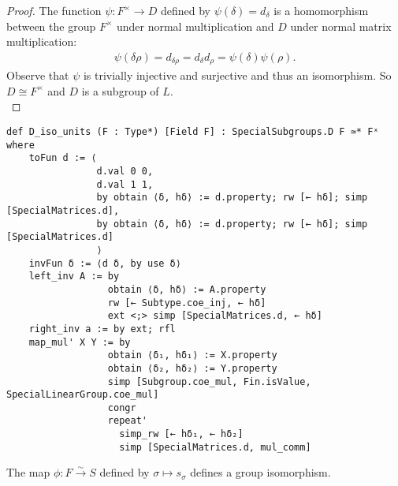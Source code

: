 \begin{proof}
    \leanok
    The function $\psi: F^\times \rightarrow D$ defined by $\psi(\delta) = d_\delta$ is a homomorphism between the group $F^\times$ under normal multiplication and $D$ under normal matrix multiplication:
\begin{align*} \psi(\delta \rho) = d_{\delta \rho} =  d_\delta d_\rho = \psi(\delta) \psi(\rho). 
\end{align*}
Observe that $\psi$ is trivially injective and surjective and thus an isomorphism. So $D\cong F^\times$ and $D$ is a subgroup of $L$.\\
\end{proof}
\begin{footnotesize}
\begin{verbatim}
def D_iso_units (F : Type*) [Field F] : SpecialSubgroups.D F ≃* Fˣ where
    toFun d := ⟨
                d.val 0 0,
                d.val 1 1,
                by obtain ⟨δ, hδ⟩ := d.property; rw [← hδ]; simp [SpecialMatrices.d],
                by obtain ⟨δ, hδ⟩ := d.property; rw [← hδ]; simp [SpecialMatrices.d]
                ⟩
    invFun δ := ⟨d δ, by use δ⟩
    left_inv A := by
                  obtain ⟨δ, hδ⟩ := A.property
                  rw [← Subtype.coe_inj, ← hδ]
                  ext <;> simp [SpecialMatrices.d, ← hδ]
    right_inv a := by ext; rfl
    map_mul' X Y := by
                  obtain ⟨δ₁, hδ₁⟩ := X.property
                  obtain ⟨δ₂, hδ₂⟩ := Y.property
                  simp [Subgroup.coe_mul, Fin.isValue, SpecialLinearGroup.coe_mul]
                  congr
                  repeat'
                    simp_rw [← hδ₁, ← hδ₂]
                    simp [SpecialMatrices.d, mul_comm]
\end{verbatim}
\end{footnotesize}



\begin{definition}
\label{SpecialSubgroups.S_iso_F}
\leanok
    The map $\phi : F \overset{\sim}{\rightarrow} S$ defined by $\sigma \mapsto s_\sigma$ defines a group isomorphism.
\end{definition}

